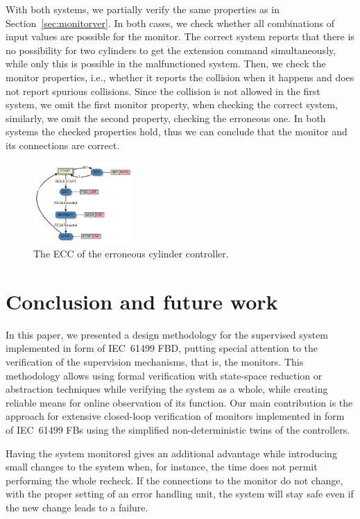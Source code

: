 \begin{bibunit}
With both systems, we partially verify the same properties as in Section~\ref{sec:monitorver}. In both cases, we check whether all combinations of input values are possible for the monitor. The correct system reports that there is no possibility for two cylinders to get the extension command simultaneously, while only this is possible in the malfunctioned system. Then, we check the monitor properties, i.e., whether it reports the collision when it happens and does not report spurious collisions. Since the collision is not allowed in the first system, we omit the first monitor property, when checking the correct system, similarly, we omit the second property, checking the erroneous one. In both systems the checked properties hold, thus we can conclude that the monitor and its connections are correct.

\begin{figure}[t]
    \centering
    \includegraphics[width=0.34\textwidth]{MX_Papers/Paper3/pic/errctlecc.png}
    \caption{The ECC of the erroneous cylinder controller.}
    \label{fig:errctlecc}
\end{figure}

\section{Conclusion and future work}
\label{sec:concl}

In this paper, we presented a design methodology for the supervised system implemented in form of IEC~61499 FBD, putting special attention to the verification of the supervision mechanisms, that is, the monitors. This methodology allows using formal verification with state-space reduction or abstraction techniques while verifying the system as a whole, while creating reliable means for online observation of its function. Our main contribution is the approach for extensive closed-loop verification of monitors implemented in form of IEC~61499 FBs using the simplified non-deterministic twins of the controllers.

Having the system monitored gives an additional advantage while introducing small changes to the system when, for instance, the time does not permit performing the whole recheck. If the connections to the monitor do not change, with the proper setting of an error handling unit, the system will stay safe even if the new change leads to a failure.


\end{bibunit}

